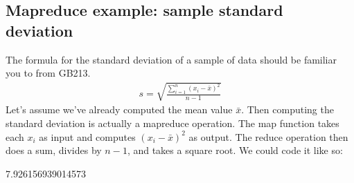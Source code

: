 \documentclass[letterpaper,10pt,english]{jupyterBook}
\begin{document}
\subsection{Map\sphinxhyphen{}reduce example: sample standard deviation}
\label{\detokenize{chapter-11-processing-rows:map-reduce-example-sample-standard-deviation}}
\sphinxAtStartPar
The formula for the standard deviation of a sample of data should be familiar you to from GB213.
\begin{equation*}
\begin{split} s=\sqrt{\frac{\sum_{i=1}^n (x_i-\bar x)^2}{n-1}} \end{split}
\end{equation*}
\sphinxAtStartPar
Let’s assume we’ve already computed the mean value \(\bar x\).  Then computing the standard deviation is actually a map\sphinxhyphen{}reduce operation.  The map function takes each \(x_i\) as input and computes \((x_i-\bar x)^2\) as output.  The reduce operation then does a sum, divides by \(n-1\), and takes a square root.  We could code it like so:

\begin{sphinxVerbatim}[commandchars=\\\{\}]
   

  \PYG{p}{[}\PYG{p}{]}
  

    
           
    
             

    
\end{sphinxVerbatim}

\begin{sphinxVerbatim}[commandchars=\\\{\}]
7.926156939014573
\end{sphinxVerbatim}
\end{document}
